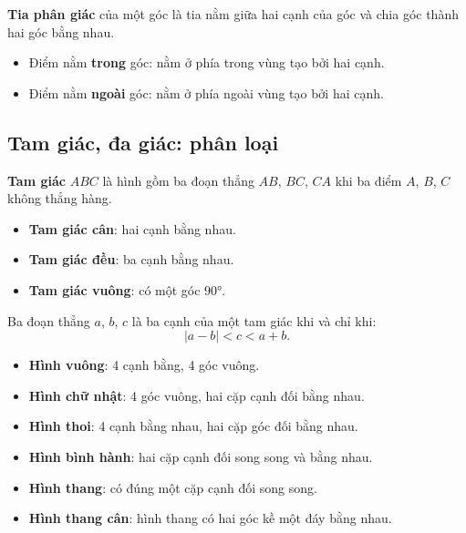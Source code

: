 \documentclass[12pt,a4paper]{article}
\begin{document}
\begin{dinhnghia}[title={Tia phân giác}]
\textbf{Tia phân giác} của một góc là tia nằm giữa hai cạnh của góc và chia góc thành hai góc bằng nhau.
\end{dinhnghia}

\begin{luuy}
\begin{itemize}
  \item Điểm nằm \textbf{trong} góc: nằm ở phía trong vùng tạo bởi hai cạnh.
  \item Điểm nằm \textbf{ngoài} góc: nằm ở phía ngoài vùng tạo bởi hai cạnh.
\end{itemize}
\end{luuy}

\subsection{Tam giác, đa giác: phân loại}

\begin{dinhnghia}
\textbf{Tam giác} $ABC$ là hình gồm ba đoạn thẳng $AB$, $BC$, $CA$ khi ba điểm $A$, $B$, $C$ không thẳng hàng.
\end{dinhnghia}

\begin{tinhchat}[title={Phân loại tam giác}]
\begin{itemize}
  \item \textbf{Tam giác cân}: hai cạnh bằng nhau.
  \item \textbf{Tam giác đều}: ba cạnh bằng nhau.
  \item \textbf{Tam giác vuông}: có một góc $90°$.
\end{itemize}
\end{tinhchat}

\begin{dinhly}[title={Bất đẳng thức tam giác}]
Ba đoạn thẳng $a$, $b$, $c$ là ba cạnh của một tam giác khi và chỉ khi:
\[|a - b| < c < a + b.\]
\end{dinhly}

\begin{tinhchat}[title={Một số đa giác đặc biệt}]
\begin{itemize}
  \item \textbf{Hình vuông}: 4 cạnh bằng, 4 góc vuông.
  \item \textbf{Hình chữ nhật}: 4 góc vuông, hai cặp cạnh đối bằng nhau.
  \item \textbf{Hình thoi}: 4 cạnh bằng nhau, hai cặp góc đối bằng nhau.
  \item \textbf{Hình bình hành}: hai cặp cạnh đối song song và bằng nhau.
  \item \textbf{Hình thang}: có đúng một cặp cạnh đối song song.
  \item \textbf{Hình thang cân}: hình thang có hai góc kề một đáy bằng nhau.
\end{itemize}
\end{tinhchat}
\end{document}
